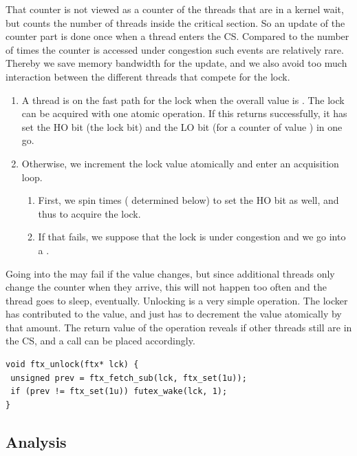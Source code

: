 That counter
\iflong%
is not viewed as a counter of the threads that are in a kernel wait, but
\fi
counts the number of threads inside the critical
section.  So an update of the counter part is done once when a
thread enters the CS.
\iflong%
Compared to the number of times
the counter is accessed under congestion such events are relatively
rare. Thereby we save memory bandwidth for the update, and we also
avoid too much interaction between the different threads that
compete for the lock.
\fi

\itemadjust
\begin{enumerate}
\item A thread is on the fast path for the lock when the overall value
is . The lock can be acquired with one atomic operation.
\iflong%
If
this returns successfully, it has set the HO bit (the lock bit)
and the LO bit (for a counter of value ) in one go.
\fi
\itemadjust
\item Otherwise, we increment the lock value atomically and enter an
  acquisition loop.\itemadjust
\begin{enumerate}
\item First, we spin  times
\iflong%
( determined below) to set the HO
bit as well, and thus
\else%
to
\fi%
acquire the lock.
\item If that fails,
\iflong%
we suppose that the lock is under congestion and
\fi%
we go into a .
\itemadjust
\end{enumerate}
\end{enumerate}
\iflong%
Going into the  may fail if the value changes, but
since additional threads only change the counter when they arrive,
this will not happen too often and the thread goes to sleep,
eventually.
\fi%
Unlocking is a very simple operation. The locker has contributed
 to the value, and just has to decrement the value
atomically by that amount.  The return value of the operation
reveals if other threads still are in the CS, and a
 call can be placed accordingly.
\iflong%
\lstset{language=C11,label= ,caption= ,numbers=none}
\begin{lstlisting}
void ftx_unlock(ftx* lck) {
 unsigned prev = ftx_fetch_sub(lck, ftx_set(1u));
 if (prev != ftx_set(1u)) futex_wake(lck, 1);
}
\end{lstlisting}
\fi

\subsection{Analysis}
\label{sec-3-2}

